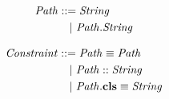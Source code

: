 \begin{figure}[t] %
\begin{subfigure}[c]{1\textwidth}
\centering
\begin{subfigure}[c]{0.45\textwidth}
\begin{align*}
\mathit{Path} &::=
     \mathit{String}\\
  &\quad|\ \mathit{Path.String}
\end{align*}
\end{subfigure}
\begin{subfigure}[c]{0.45\textwidth}
\begin{align*}
\mathit{Constraint} &::=
     \mathit{Path} \equiv \mathit{Path}\\
  &\quad|\ \mathit{Path} :: \mathit{String}\\
  &\quad|\ \mathit{Path}.\textbf{cls} \equiv \mathit{String}
\end{align*}
\end{subfigure}
%

\end{subfigure}
\end{figure}
